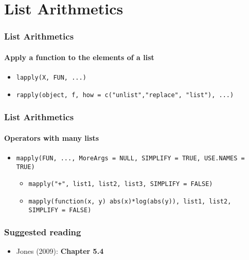 \documentclass[10pt]{beamer}
\begin{document}
\section{List Arithmetics}

\begin{frame}
  \frametitle{List Arithmetics}
  \framesubtitle{Apply a function to the elements of a list}
  \begin{itemize}
  \item \texttt{lapply(X, FUN, ...)}
  \item \texttt{rapply(object, f,  how = c("unlist","replace", "list"), ...)}
  \end{itemize}
\end{frame}


\begin{frame}
  \frametitle{List Arithmetics}
  \framesubtitle{Operators with many lists}
  \begin{itemize}
  \item  \texttt{mapply(FUN, ..., MoreArgs = NULL, SIMPLIFY = TRUE, USE.NAMES = TRUE)}

    \begin{itemize}
    \item \texttt{mapply("+", list1, list2, list3, SIMPLIFY = FALSE)}
    \item \texttt{mapply(function(x, y) abs(x)*log(abs(y)), list1, list2, SIMPLIFY = FALSE)}

    \end{itemize}

  \end{itemize}
\end{frame}




\begin{frame}
  \frametitle{Suggested reading}

  \begin{itemize}
  \item Jones (2009): \textbf{Chapter 5.4}
  \end{itemize}

\end{frame}
\end{document}
